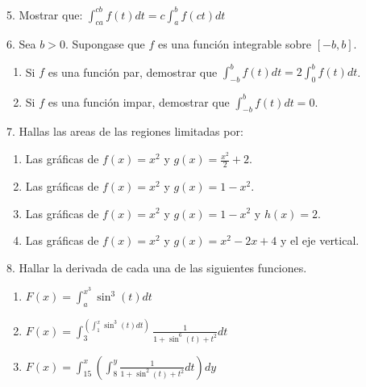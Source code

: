 \documentclass[12pt]{article}
\begin{document}
5. Mostrar que: \quad \(\displaystyle\int_{ca}^{cb}f(t)dt=c\displaystyle\int_{a}^{b}f(ct)dt\)

6. Sea $b>0$. Supongase que $f$ es una funci\'on integrable sobre $[-b,b]$.

\begin{enumerate}[\hspace{9px} a)]
    \item Si $f$ es una funci\'on par, demostrar que \(\displaystyle\int_{-b}^{b}f(t)dt=2\int_{0}^{b}f(t)dt\).
    
    \item Si $f$ es una funci\'on impar, demostrar que \(\displaystyle\int_{-b}^{b}f(t)dt=0\).

\end{enumerate}

7. Hallas las areas de las regiones limitadas por:

\begin{enumerate}[\hspace{9px} a)]
    \item Las gr\'aficas de \(f(x)=x^2\) y \(g(x)=\displaystyle\frac{x^2}{2}+2\).
    
    \item Las gr\'aficas de \(f(x)=x^2\) y \(g(x)=1-x^2\).
    
    \item Las gr\'aficas de \(f(x)=x^2\) y \(g(x)=1-x^2\) y \(h(x)=2\).
    
    \item Las gr\'aficas de \(f(x)=x^2\) y \(g(x)=x^2-2x+4\) y el eje vertical.

\end{enumerate}

8. Hallar la derivada de cada una de las siguientes funciones.

\begin{enumerate}[\hspace{9px} a)]
    \item \(F(x)=\displaystyle\int_{a}^{x^3}\sin^3(t)dt\)
    
    \item \(F(x)=\displaystyle\int_{3}^{\left(\displaystyle\int_{1}^{x}\sin^3(t)dt\right)}\frac{1}{1+\sin^6(t)+t^2}dt\)
    
    \item \(F(x)=\displaystyle\int_{15}^{x}\left(\int_{8}^{y}\frac{1}{1+\sin^2(t)+t^2}dt\right)dy\)

\end{enumerate}
\end{document}
